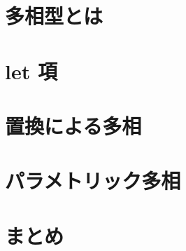 


\section{多相型とは}



\section{let 項}



\section{置換による多相}



\section{パラメトリック多相}



\section{まとめ}




